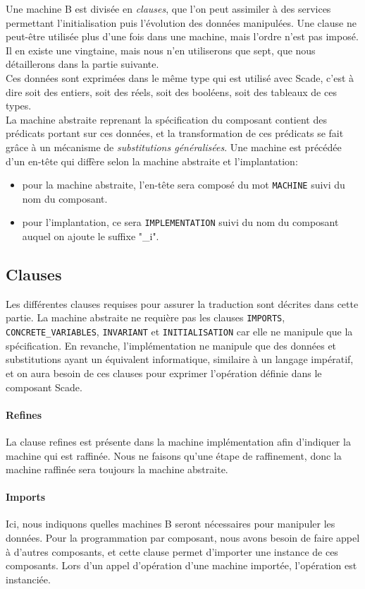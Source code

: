 Une machine B est divisée en \emph{clauses}, que l'on peut assimiler à
des services permettant l'initialisation puis l'évolution des données
manipulées. Une clause ne peut-être utilisée plus d'une fois dans une
machine, mais l'ordre n'est pas imposé. Il en existe une vingtaine,
mais nous n'en utiliserons que sept, que nous détaillerons dans la
partie suivante.\\ 
Ces données sont exprimées dans le même type qui est utilisé avec
Scade, c'est à dire soit des entiers, soit des réels, soit des
booléens, soit des tableaux de ces types.\\ 
La machine abstraite reprenant la spécification du composant contient
des prédicats portant sur ces données, et la transformation
de ces prédicats se fait grâce à un mécanisme de \emph{substitutions généralisées}.
Une machine est précédée d'un en-tête qui diffère selon la machine
abstraite et l'implantation:
\begin{itemize}
\item pour la machine abstraite, l'en-tête sera composé du mot \texttt{MACHINE} suivi
  du nom du composant.
\item pour l'implantation, ce sera \texttt{IMPLEMENTATION} suivi du nom du
  composant auquel on ajoute le suffixe "\_i".
\end{itemize}

\subsection{Clauses}
Les différentes clauses requises pour assurer la traduction sont
décrites dans cette partie. La machine abstraite ne requière pas les
clauses \texttt{IMPORTS}, \texttt{CONCRETE\_VARIABLES}, \texttt{INVARIANT} et \texttt{INITIALISATION} car
elle ne manipule que la spécification. En revanche, l'implémentation ne
manipule que des données et substitutions ayant un équivalent
informatique, similaire à un langage impératif, et on aura besoin de
ces clauses pour exprimer l'opération définie dans le composant Scade.

\paragraph{Refines}
La clause refines est présente dans la machine implémentation afin
d'indiquer la machine qui est raffinée. Nous ne faisons qu'une étape
de raffinement, donc la machine raffinée sera toujours la machine
abstraite. 

\paragraph{Imports}
Ici, nous indiquons quelles machines B seront nécessaires pour
manipuler les données. Pour la programmation par composant, nous avons
besoin de faire appel à d'autres composants, et cette clause permet
d'importer une instance de ces composants. Lors d'un appel d'opération d'une machine
importée, l'opération est instanciée.

